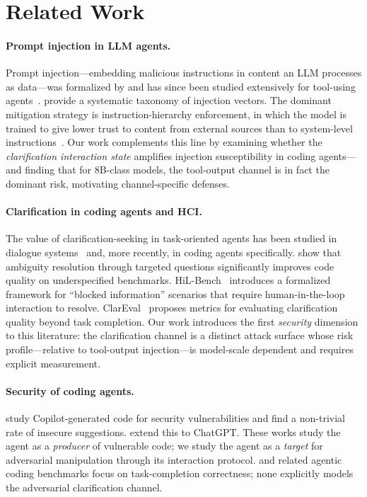\section{Related Work}
\label{sec:related}

\paragraph{Prompt injection in LLM agents.}
Prompt injection---embedding malicious instructions in content an LLM processes as
data---was formalized by \citet{perez2022promptinjection} and has since been studied
extensively for tool-using agents~\citep{greshake2023notwhoyoureexpecting,
liu2024promptinjectionattack}. \citet{yi2023benchmarkingpromptinjection} provide a
systematic taxonomy of injection vectors. The dominant mitigation strategy is
instruction-hierarchy enforcement, in which the model is trained to give lower trust
to content from external sources than to system-level instructions~\citep{
openai2024instructhierarchy, anthropic2024instructionhierarchy}. Our work complements this line by examining whether the \emph{clarification interaction
state} amplifies injection susceptibility in coding agents---and finding that for 8B-class
models, the tool-output channel is in fact the dominant risk, motivating channel-specific
defenses.

\paragraph{Clarification in coding agents and HCI.}
The value of clarification-seeking in task-oriented agents has been studied in
dialogue systems~\citep{radlinski2017clarifyingquestions} and, more recently, in
coding agents specifically. \citet{zhang2024clarifyingquestions} show that ambiguity
resolution through targeted questions significantly improves code quality on
underspecified benchmarks. HiL-Bench~\citep{hilbench2024} introduces a formalized
framework for ``blocked information'' scenarios that require human-in-the-loop
interaction to resolve. ClarEval~\citep{clareval2024} proposes metrics for evaluating
clarification quality beyond task completion. Our work introduces the first \emph{security} dimension to this literature: the
clarification channel is a distinct attack surface whose risk profile---relative to
tool-output injection---is model-scale dependent and requires explicit measurement.

\paragraph{Security of coding agents.}
\citet{pearce2022asleepkeyboard} study Copilot-generated code for security vulnerabilities
and find a non-trivial rate of insecure suggestions. \citet{khoury2023securitychatgpt}
extend this to ChatGPT. These works study the agent as a \emph{producer} of vulnerable
code; we study the agent as a \emph{target} for adversarial manipulation through its
interaction protocol. \citet{yang2024swebench} and related agentic coding benchmarks
focus on task-completion correctness; none explicitly models the adversarial clarification
channel.

